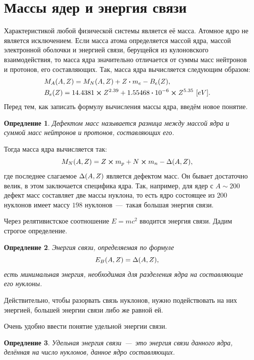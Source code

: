 \documentclass[12pt]{article}
\newtheorem{definition}{Опредление}[section]
\begin{document}
\section{Массы ядер и энергия связи}
Характеристикой любой физической системы является её масса. Атомное ядро не является исключением. Если масса атома определяется массой ядра, массой электронной оболочки и энергией связи, берущейся из кулоновского взаимодействия, то масса ядра значительно отличается от суммы масс нейтронов и протонов, его составляющих. Так, масса ядра вычисляется следующим образом:
\begin{equation}
\begin{split}
	&M_A \qty(A,Z) = M_N\qty(A,Z) + Z\vdot m_e - B_e \qty(Z),\\
	&B_e\qty(Z) = 14.4381\cross Z^{2.39} + 1.55468\vdot 10^{-6}\cross Z^{5.35}\ [eV].
\end{split}
\end{equation}
Перед тем, как записать формулу вычисления массы ядра, введём новое понятие.
\begin{definition}
	Дефектом масс называется разница между массой ядра и суммой масс нейтронов и протонов, составляющих его.
\end{definition}
Тогда масса ядра вычисляется так:
\begin{equation}
M_N\qty(A,Z) = Z\cross m_p + N \cross m_n - \Delta \qty(A,Z),
\end{equation}
где последнее слагаемое $\Delta \qty(A,Z)$ является дефектом масс. Он бывает достаточно велик, в этом заключается специфика ядра. Так, например, для ядер с $A \sim 200$ дефект масс составляет две массы нуклона, то есть ядро состоящее из $200$ нуклонов имеет массу $198$ нуклонов~\----~такая большая энергия связи.
\par
Через релятивистское соотношение $E = mc^2$ вводится энергия связи. Дадим строгое определение.
\begin{definition}
	Энергия связи, определяемая по формуле
	\begin{equation}
		E_B\qty(A,Z) = \Delta \qty(A,Z),
	\end{equation}
	есть минимальная энергия, необходимая для разделения ядра на составляющие его нуклоны.
\end{definition}
Действительно, чтобы разорвать связь нуклонов, нужно подействовать на них энергией, большей энергии связи либо же равной ей.
\par
Очень удобно ввести понятие удельной энергии связи.
\begin{definition}
	Удельная энергия связи~\----~это энергия связи данного ядра, делённая на число нуклонов, данное ядро составляющих.
\end{definition}
\end{document}
